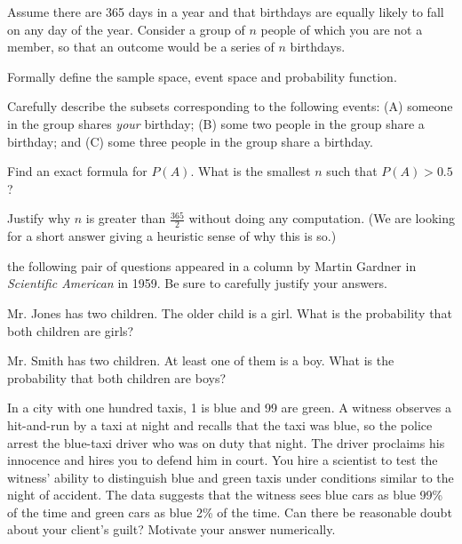 \documentclass[a4paper,10pt,landscape,twocolumn]{scrartcl}
\begin{document}
\begin{exercise}[Birthdays]
	Assume there are 365 days in a year and that birthdays are equally likely to fall on any day of the year. Consider a group of $n$ people of which you are not a member, so that an outcome would be a series of $n$ birthdays.
	\begin{subex}
		Formally define the sample space, event space and probability function.
	\end{subex}
	
	\begin{subex}
		Carefully describe the subsets corresponding to the following events: (A) someone in the group shares \emph{your} birthday; (B) some two people in the group share a birthday; and (C) some three people in the group share a birthday.
	\end{subex}
	
	\begin{subex}
	Find an exact formula for $P(A)$. What is the smallest $n$ such that $P(A) > 0.5$?	
	\end{subex}
	
	\begin{subex}
	Justify why $n$ is greater than $\frac{3	65}{2}$ without doing any computation. (We are looking for a short answer giving a heuristic sense of why this is so.)
	\end{subex}
\end{exercise}


\begin{exercise}
	the following pair of questions appeared in a column by Martin Gardner in \emph{Scientific American} in 1959. 	Be sure to carefully justify your answers.
	
	\begin{subex}
	Mr. Jones has two children. The older child is a girl. What is the probability that both children are girls?
	\end{subex}
	
	\begin{subex}
	Mr. Smith has two children. At least one of them is a boy. What is the probability that both children are boys?
	\end{subex}
	
\end{exercise}

\begin{exercise}[Taxi's]
	In a city with one hundred taxis, 1 is blue and 99 are green. A witness observes a hit-and-run by a taxi at night and recalls that the taxi was blue, so the police arrest the blue-taxi driver who was on duty that night. The driver proclaims his innocence and hires you to defend him in court. You hire a scientist to test the witness' ability to distinguish blue and green taxis under conditions similar to the night of accident. The data suggests that the witness sees blue cars as blue 99\% of the time and green cars as blue 2\% of the time. Can there be reasonable doubt about your client's guilt? Motivate your answer numerically.
\end{exercise}

\vfill
{}
\end{document}
